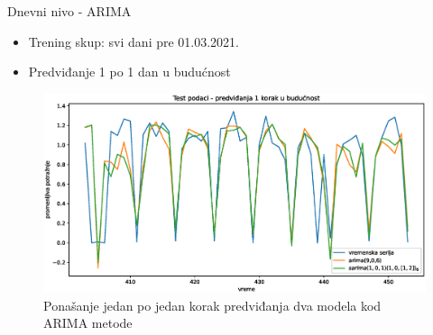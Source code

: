 \documentclass{beamer}
\begin{document}
\begin{frame}{Dnevni nivo - ARIMA}
\begin{itemize}
    \item Trening skup: svi dani pre 01.03.2021.
    \item Predviđanje 1 po 1 dan u budućnost
\end{itemize}

\begin{figure}[!ht]
  \centering
  \includegraphics[width=1\textwidth]{./images/grafici/test_dnevna_arima.eps}
  \caption{Ponašanje jedan po jedan korak predviđanja dva modela kod ARIMA metode}
  \label{fig: test_arima}
\end{figure}

\end{frame}
\end{document}
